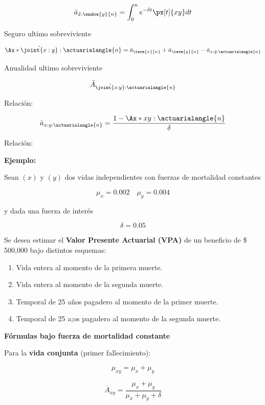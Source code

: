 \documentclass[12pt, a4paper, footinclude=true]{scrbook}
\begin{document}
$$\bar{a}_{\tilde{x}:\endow{y}{n}} = \int_0 ^n e^{- \delta t} \px[t]{xy} dt$$

Seguro ultimo sobreviviente 

$$\Ax*{\tilde{\joint{x:y}}:\actuarialangle{n}} = \bar{a}_{\term{x}{n}} + \bar{a}_{\term{y}{n}} - \bar{a}_{x:\tilde{y}:\actuarialangle{n}}$$

Anualidad ultimo sobreviviente

$$ \bar{A}_{\tilde{\joint{x:y}}:\actuarialangle{n}} $$

Relación: 

$$\bar{a}_{x:y:\actuarialangle{n}} = \frac{1 - \Ax*{xy:\actuarialangle{n}}}{\delta}$$

Relación:


\textbf{Ejemplo:}

Sean $(x)$ y $(y)$ dos vidas independientes con fuerzas de mortalidad constantes

\[
	\mu_x = 0{.}002 \quad \mu_y = 0{.}004
\] 

y dada una fuerza de interés

\[
	\delta = 0{.}05
\] 

Se desea estimar el \textbf{Valor Presente Actuarial (VPA)} de un beneficio de \$ 500{,}000 bajo distintos esquemas:

\vspace{0.2cm}

\begin{enumerate}[label =\alph*)]
	\item Vida entera al momento de la primera muerte.
	\item Vida entera al momento de la segunda muerte.
	\item Temporal de 25 años pagadero al momento de la primer muerte. 
	\item Temporal de 25 a;os pagadero al momento de la segunda muerte. 
\end{enumerate}

	\vspace{0.2cm}

	\textbf{Fórmulas bajo fuerza de mortalidad constante}
	
	\vspace{0.2cm}
	
	Para la \textbf{vida conjunta} (primer fallecimiento):
	
	\[
	\mu_{xy} = \mu_x + \mu_y
	\]
	
	\[
	\overline{A}_{xy}
	=
	\frac{\mu_x + \mu_y}{\mu_x + \mu_y + \delta}
	\]
	
\end{document}
